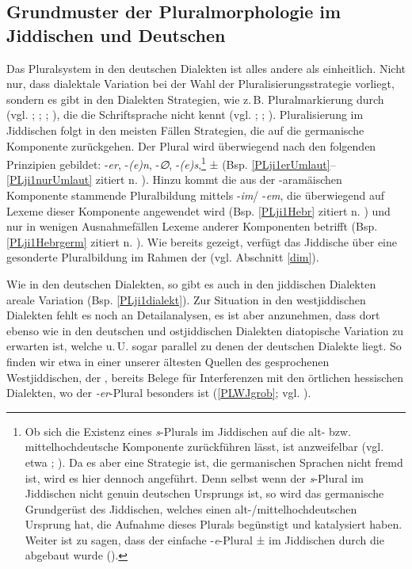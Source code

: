  
\subsection{Grundmuster der Pluralmorphologie im Jiddischen und Deutschen}\label{plDEUJI}
 Das Pluralsystem in den deutschen Dialekten ist alles andere als einheitlich. Nicht nur, dass dialektale Variation bei der Wahl der Pluralisierungsstrategie vorliegt, sondern es gibt  in den Dialekten  Strategien, wie z.\,B. Pluralmarkierung durch  (vgl. \cite{GolstonWiese1996}; \cite{HolsingerHouseman1999}; \cite{Knaus2003}; \cite{BirkenesDiss}), die die Schriftsprache nicht kennt (vgl. \cite[414–443]{Schirmunski1962}; \cite{Nuebling2005}; \cite[insbes. 155–169]{Wiese2009}). Pluralisierung im Jiddischen folgt in den meisten Fällen Strategien, die auf die germanische Komponente zurückgehen. Der Plural wird überwiegend nach den folgenden Prinzipien gebildet: -\textit{er}, -\textit{(e)n}, -\textit{∅},  -\textit{(e)s},\footnote{Ob sich die Existenz eines \textit{s}-Plurals im Jiddischen auf die alt- bzw. mittelhochdeutsche Komponente zurückführen lässt, ist anzweifelbar (vgl. etwa \cite{King1990}; \cite{Timm2007}). Da es aber eine Strategie ist, die germanischen Sprachen nicht fremd ist, wird es hier dennoch angeführt. Denn selbst wenn der \textit{s}-Plural im Jiddischen nicht genuin deutschen Ursprungs ist, so wird das germanische Grundgerüst des Jiddischen, welches einen alt-/mittelhochdeutschen Ursprung hat, die Aufnahme dieses Plurals begünstigt und katalysiert haben. Weiter ist zu sagen, dass der einfache -\textit{e}-Plural ±  im Jiddischen durch die  abgebaut wurde (\cite[29]{Timm2007}).\label{FNsplural}} ±  (Bsp. \ref{PLji1erUmlaut}–\ref{PLji1nurUmlaut} zitiert n. \cite[163]{Jacobs2005}). Hinzu kommt die aus der -aramäischen Komponente stammende Pluralbildung mittels  -\textit{im}/ -\textit{em}, die überwiegend auf Lexeme dieser Komponente angewendet wird (Bsp. \ref{PLji1Hebr} zitiert n. \cite[165]{Jacobs2005}) und nur in wenigen Ausnahmefällen Lexeme anderer Komponenten betrifft (Bsp. \ref{PLji1Hebrgerm} zitiert n. \cite[165]{Jacobs2005}). Wie bereits gezeigt, verfügt das Jiddische über eine gesonderte Pluralbildung im Rahmen der  (vgl. Abschnitt \ref{dim}).

Wie in den deutschen Dialekten, so gibt es auch in den jiddischen Dialekten areale Variation (Bsp. \ref{PLji1dialekt}). Zur Situation in den westjiddischen Dialekten fehlt es noch an Detailanalysen, es ist aber anzunehmen,  dass dort ebenso wie in den deutschen und ostjiddischen Dialekten diatopische Variation zu erwarten ist, welche u.\,U. sogar parallel zu denen der deutschen Dialekte liegt. So finden wir etwa in einer unserer ältesten Quellen des gesprochenen Westjiddischen, der , bereits  Belege für Interferenzen mit den örtlichen hessischen Dialekten, wo der \textit{-er}-Plural besonders  ist (\ref{PLWJgrob}; vgl. \cite[83]{Friebertshaeuser1987}). \\


